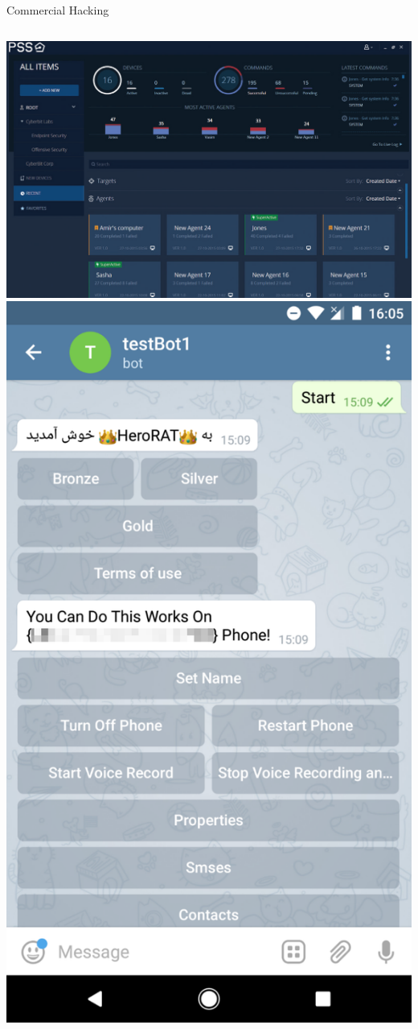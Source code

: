 \documentclass[nobackground,dvipsnames,table,aspectratio=169]{beamer}
\begin{document}
\begin{frame}{Commercial Hacking}
    \begin{columns}
            \includegraphics[width=\textwidth]{pss-commercial-hacking}
            \includegraphics[width=\textwidth]{testbot1}

\end{columns}
\end{frame}
\end{document}
